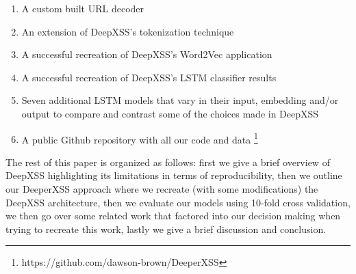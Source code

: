 \begin{enumerate}
    \item A custom built URL decoder
    \item An extension of DeepXSS's tokenization technique
    \item A successful recreation of DeepXSS's Word2Vec application
    \item A successful recreation of DeepXSS's LSTM classifier results
    \item Seven additional LSTM models that vary in their input, embedding and/or output to compare and contrast some of the choices made in DeepXSS
    \item A public Github repository with all our code and data \footnote[1]{https://github.com/dawson-brown/DeeperXSS}
\end{enumerate}

The rest of this paper is organized as follows: first we give a brief overview of DeepXSS highlighting its limitations in terms of reproducibility, then we outline our DeeperXSS approach where we recreate (with some modifications) the DeepXSS architecture, then we evaluate our models using 10-fold cross validation, we then go over some related work that factored into our decision making when trying to recreate this work, lastly we give a brief discussion and conclusion.